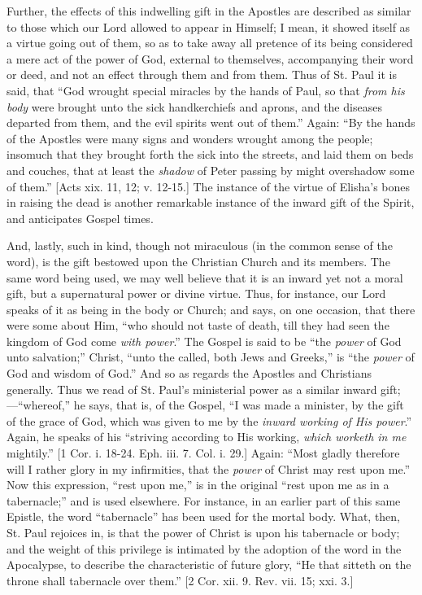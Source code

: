 Further, the effects of this indwelling gift in the Apostles are
described as similar to those which our Lord allowed to appear in
Himself; I mean, it showed itself as a virtue going out of them, so as
to take away all pretence of its being considered a mere act of the
power of God, external to themselves, accompanying their word or deed,
and not an effect through them and from them. Thus of St. Paul it is
said, that ``God wrought special miracles by the hands of Paul, so
that \emph{from his body} were brought unto the sick handkerchiefs and
aprons, and the diseases departed from them, and the evil spirits went
out of them.'' Again: ``By the hands of the Apostles were many
signs and wonders wrought among the people; insomuch that they brought
forth the sick into the streets, and laid them on beds and couches,
that at least the \emph{shadow} of Peter passing by might overshadow
some of them.'' [Acts xix. 11, 12; v. 12-15.] The instance of the
virtue of Elisha's bones in raising the dead is another remarkable
instance of the inward gift of the Spirit, and anticipates Gospel
times.

And, lastly, such in kind, though not miraculous (in the common
sense of the word), is the gift bestowed upon the Christian Church and
its members. The same word being used, we may well believe that it is
an inward yet not a moral gift, but a supernatural power or divine
virtue. Thus, for instance, our Lord speaks of it as being in the body
or Church; and says, on one occasion, that there were some about Him,
``who should not taste of death, till they had seen the kingdom of
God come \emph{with power}.'' The Gospel is said to be ``the \emph{power}
of God unto salvation;'' Christ, ``unto the called, both
Jews and Greeks,'' is ``the \emph{power} of God and wisdom of
God.'' And so as regards the Apostles and Christians generally.
Thus we read of St. Paul's ministerial power as a similar inward gift;—``whereof,''
he says, that is, of the Gospel, ``I was made a minister, by the
gift of the grace of God, which was given to me by the \emph{inward
working of His power}.'' Again, he speaks of his ``striving
according to His working, \emph{which worketh in me} mightily.''
[1 Cor. i. 18-24. Eph. iii. 7. Col. i. 29.] Again: ``Most gladly
therefore will I rather glory in my infirmities, that the \emph{power}
of Christ may rest upon me.'' Now this expression, ``rest upon
me,'' is in the original ``rest upon me as in a
tabernacle;'' and is used elsewhere. For instance, in an earlier
part of this same Epistle, the word ``tabernacle'' has been
used for the mortal body. What, then, St. Paul rejoices in, is that
the power of Christ is upon his tabernacle or body; and the weight of
this privilege is intimated by the adoption of the word in the
Apocalypse, to describe the characteristic of future glory, ``He
that sitteth on the throne shall tabernacle over them.'' [2 Cor.
xii. 9. Rev. vii. 15; xxi. 3.]

